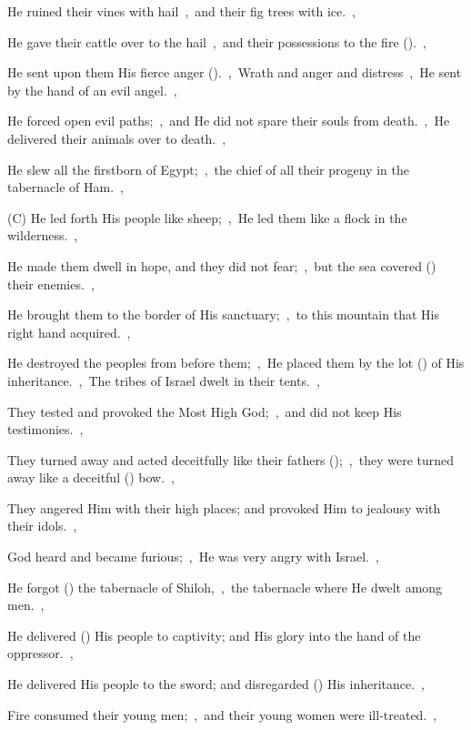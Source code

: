 \documentclass[12pt,twoside,a5paper]{article}
\begin{document}
\begin{normalparskip}
  He ruined their vines with hail~\sep\ and their fig trees with ice.~\sep

  He gave their cattle over to the hail~\sep\ and their possessions to the fire ().~\sep

  He sent upon them His fierce anger ().~\sep\ Wrath and anger and distress~\sep\ He sent by the hand of an evil angel.~\sep

  He forced open evil paths;~\sep\ and He did not spare their souls from death.~\sep\ He delivered their animals over to death.~\sep

  He slew all the firstborn of Egypt;~\sep\ the chief of all their progeny in the tabernacle of Ham.~\sep

  (C) He led forth His people like sheep;~\sep\ He led them like a flock in the wilderness.~\sep

  He made them dwell in hope, and they did not fear;~\sep\ but the sea covered () their enemies.~\sep

  He brought them to the border of His sanctuary;~\sep\ to this mountain that His right hand acquired.~\sep

  He destroyed the peoples from before them;~\sep\ He placed them by the lot () of His inheritance.~\sep\ The tribes of Israel dwelt in their tents.~\sep

  They tested and provoked the Most High God;~\sep\ and did not keep His testimonies.~\sep

  They turned away and acted deceitfully like their fathers ();~\sep\ they were turned away like a deceitful () bow.~\sep

  They angered Him with their high places; and provoked Him to jealousy with their idols.~\sep

  God heard and became furious;~\sep\ He was very angry with Israel.~\sep

  He forgot () the tabernacle of Shiloh,~\sep\ the tabernacle where He dwelt among men.~\sep

  He delivered () His people to captivity; and His glory into the hand of the oppressor.~\sep

  He delivered His people to the sword; and disregarded () His inheritance.~\sep

  Fire consumed their young men;~\sep\ and their young women were ill-treated.~\sep


\end{normalparskip}
\end{document}
